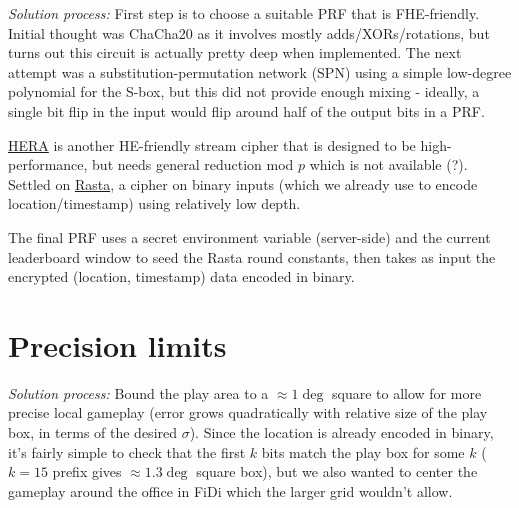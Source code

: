 \documentclass{article}
\begin{document}
\noindent{}
\vspace{0.3cm}

\textit{Solution process:} First step is to choose a suitable PRF that is FHE-friendly. 
Initial thought was ChaCha20 as it involves mostly adds/XORs/rotations, but turns out this circuit is actually pretty deep when implemented. 
The next attempt was a substitution-permutation network (SPN) using a simple low-degree polynomial for the S-box, but this did not provide enough mixing - ideally, a single bit flip in the input would flip around half of the output bits in a PRF.

\href{https://eprint.iacr.org/2020/1335.pdf}{HERA} is another HE-friendly stream cipher that is designed to be high-performance, but needs general reduction mod $p$ which is not available (?).
Settled on \href{https://eprint.iacr.org/2018/181.pdf}{Rasta}, a cipher on binary inputs (which we already use to encode location/timestamp) using relatively low depth.

The final PRF uses a secret environment variable (server-side) and the current leaderboard window to seed the Rasta round constants, then takes as input the encrypted (location, timestamp) data encoded in binary.

\section{Precision limits}

\noindent{}
\vspace{0.3cm}

\textit{Solution process:} Bound the play area to a $\approx 1 \deg$ square to allow for more precise local gameplay (error grows quadratically with relative size of the play box, in terms of the desired $\sigma$).
Since the location is already encoded in binary, it's fairly simple to check that the first $k$ bits match the play box for some $k$ ($k=15$ prefix gives $\approx 1.3 \deg$ square box), but we also wanted to center the gameplay around the office in FiDi which the larger grid wouldn't allow.
\end{document}
